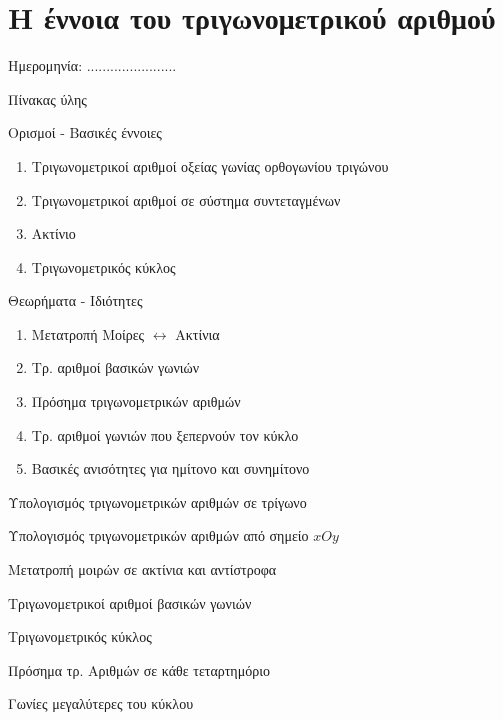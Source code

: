 \documentclass[twoside,nofonts,internet,math,spyros]{frontisthrio}
\newcommand{\myitem}{\stepcounter{enumi}\item[\raisebox{0.5mm}{\faExclamationTriangle}\ \Large$\square$]}
\begin{document}
\section{Η έννοια του τριγωνομετρικού αριθμού}
\begin{flushright}
\faCalendar* Ημερομηνία: .......................
\end{flushright}
\begin{mybox}[mysubtitle]{Πίνακας ύλης}
\begin{tcbraster}[raster columns=2,raster equal height]
\begin{myleftbox}{Ορισμοί - Βασικές έννοιες\ \ \faBook}
\begin{enumerate}[itemsep=0mm]
\item Τριγωνομετρικοί αριθμοί οξείας γωνίας ορθογωνίου τριγώνου
\item Τριγωνομετρικοί αριθμοί σε σύστημα συντεταγμένων
\item Ακτίνιο
\item Τριγωνομετρικός κύκλος
\end{enumerate}
\end{myleftbox}
\begin{myrightbox}{Θεωρήματα - Ιδιότητες\ \ \faTools}
\begin{enumerate}[itemsep=0mm]
\item Μετατροπή Μοίρες $ \leftrightarrow $ Ακτίνια
\item Τρ. αριθμοί βασικών γωνιών
\item Πρόσημα τριγωνομετρικών αριθμών
\item Τρ. αριθμοί γωνιών που ξεπερνούν τον κύκλο
\item Βασικές ανισότητες για ημίτονο και συνημίτονο
\end{enumerate}
\end{myrightbox}
\end{tcbraster}
\begin{multicols}{2}
\begin{todolist}[itemsep=0mm]
\myitem Υπολογισμός τριγωνομετρικών αριθμών σε τρίγωνο
\item Υπολογισμός τριγωνομετρικών αριθμών από σημείο $ xOy $
\item Μετατροπή μοιρών σε ακτίνια και αντίστροφα
\myitem Τριγωνομετρικοί αριθμοί βασικών γωνιών
\item Τριγωνομετρικός κύκλος
\myitem Πρόσημα τρ. Αριθμών σε κάθε τεταρτημόριο
\item Γωνίες μεγαλύτερες του κύκλου
\end{todolist}

\end{multicols}
\end{mybox}
\end{document}
